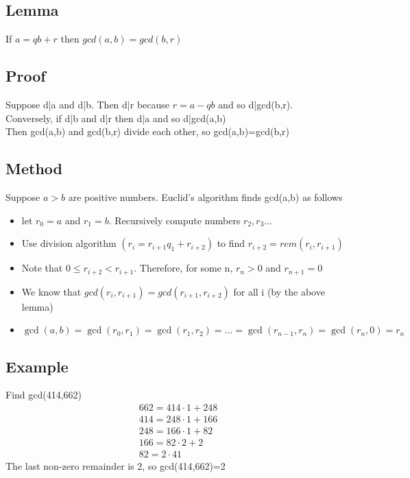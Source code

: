 \documentclass{article}[18pt]
\begin{document}
\subsection{Lemma}
If $a=qb+r$ then $gcd(a,b)=gcd(b,r)$
\subsection{Proof}
Suppose d|a and d|b. Then d|r because $r=a-qb$ and so d|gcd(b,r).\\
Conversely, if d|b and d|r then d|a and so d|gcd(a,b)\\
Then gcd(a,b) and gcd(b,r) divide each other, so gcd(a,b)=gcd(b,r)
\subsection{Method}
Suppose $a>b$ are positive numbers. Euclid's algorithm finds gcd(a,b) as follows
\begin{itemize}
	\item let $r_0=a$ and $r_1=b$. Recursively compute numbers $r_2,r_3...$
	\item Use division algorithm $(r_i=r_{i+1}q_1+r_{i+2})$ to find $r_{i+2}=rem(r_i,r_{i+1})$
	\item Note that $0\leqslant r_{i+2} <r_{i+1}$. Therefore, for some n, $r_n>0$ and $r_{n+1}=0$
	\item We know that $gcd(r_i,r_{i+1})=gcd(r_{i+1},r_{i+2})$ for all i (by the above lemma)
	\item $\operatorname { gcd } ( a , b ) = \operatorname { gcd } \left( r _ { 0 } , r _ { 1 } \right) = \operatorname { gcd } \left( r _ { 1 } , r _ { 2 } \right) = \ldots = \operatorname { gcd } \left( r _ { n - 1 } , r _ { n } \right) = \operatorname { gcd } \left( r _ { n } , 0 \right) = r _ { n }$
\end{itemize}
\subsection{Example}
Find gcd(414,662)
$$\begin{array} { l } { 662 = 414 \cdot 1 + 248 } \\ { 414 = 248 \cdot 1 + 166 } \\ { 248 = 166 \cdot 1 + 82 } \\ { 166 = 82 \cdot 2 + 2 } \\ { 82 = 2 \cdot 41 } \end{array}$$
The last non-zero remainder is 2, so gcd(414,662)=2
\end{document}
